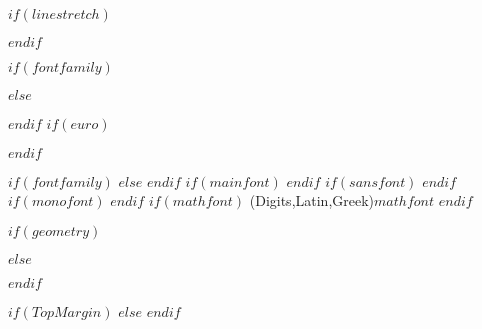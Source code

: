 $if(linestretch)$
\usepackage{setspace}
$endif$
\usepackage{amssymb,amsmath}
\usepackage{fixltx2e} %
{}\fi{} %
  \usepackage[T1]{fontenc}
  \usepackage[utf8]{inputenc}
$if(fontfamily)$
\usepackage{$fontfamily$}
$else$
\usepackage{mathptmx}
$endif$
$if(euro)$
  \usepackage{eurosym}
$endif$
\else %
  \ifxetex
    \usepackage{mathspec}
    \usepackage{xltxtra,xunicode}
  \else
    \usepackage{fontspec}
  \fi
$if(fontfamily)$
  \setmainfont{$fontfamily$}
$else$
  \setmainfont{Times New Roman}
$endif$
  \newcommand{\euro}{€}
$if(mainfont)$
    \setmainfont{$mainfont$}
$endif$
$if(sansfont)$
    \setsansfont{$sansfont$}
$endif$
$if(monofont)$
    \setmonofont[Mapping=tex-ansi]{$monofont$}
$endif$
$if(mathfont)$
    \setmathfont(Digits,Latin,Greek){$mathfont$}
$endif$
\fi
\usepackage{graphicx}
\usepackage{epstopdf}
\usepackage{calc}
$if(geometry)$
\usepackage[$for(geometry)$$geometry$$sep$,$endfor$]{geometry}
$else$
\usepackage[left=1in,right=1in,top=1in,bottom=1in,heightrounded]{geometry}
$endif$


\setlength{\defaulttopmargin}{1in}
$if(TopMargin)$
\setlength{\defaulttopmargin}{$TopMargin$}
$else$
\setlength{\defaulttopmargin}{1in}
$endif$


